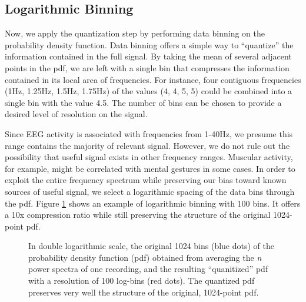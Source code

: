\subsection{Logarithmic Binning}

Now, we apply the quantization step by performing data binning on the probability density function. Data binning offers a simple way to ``quantize'' the information contained in the full signal. By taking the mean of several adjacent points in the pdf, we are left with a single bin that compresses the information contained in its local area of frequencies. For instance, four contiguous frequencies (1Hz, 1.25Hz, 1.5Hz, 1.75Hz) of the values (4, 4, 5, 5) could be combined into a single bin with the value 4.5. The number of bins can be chosen to provide a desired level of  resolution on the signal.


Since EEG activity is associated with frequencies from 1-40Hz, we presume this range contains the majority of relevant signal. However, we do not rule out the possibility that useful signal exists in other frequency ranges. Muscular activity, for example, might be correlated with mental gestures in some cases. In order to exploit the entire frequency spectrum while preserving our bias toward known sources of useful signal, we select a logarithmic spacing of the data bins through the pdf. Figure \ref{binnedEEGpowerspec} shows an example of logarithmic binning with 100 bins. It offers a 10x compression ratio while still preserving the structure of the original 1024-point pdf.

\begin{figure}[!h]
  \vspace{-0.2cm}
  \centering
  {}
\caption{In double logarithmic scale, the original 1024 bins (blue dots) of the probability density function (pdf) obtained from averaging the \emph{n} power spectra of one recording, and the resulting ``quanitized''  pdf with a resolution of 100 log-bins (red dots). The quantized pdf preserves very well the structure of the original, 1024-point pdf. }
\label{binnedEEGpowerspec}
\vspace{-0.1cm}
\end{figure}

